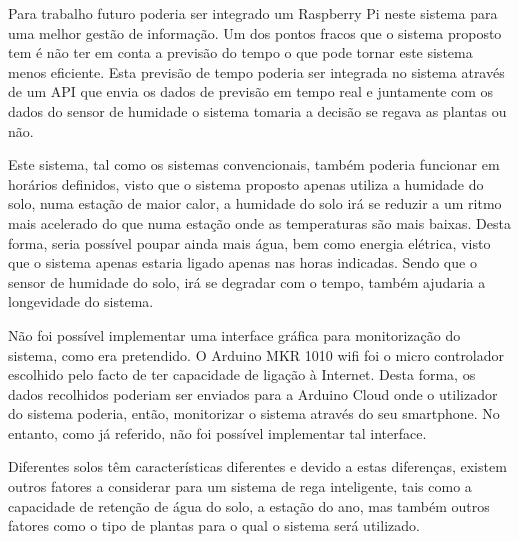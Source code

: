 \documentclass[conference]{IEEEtran}
\begin{document}
Para trabalho futuro poderia ser integrado um Raspberry Pi neste sistema para uma melhor
gestão de informação. Um dos pontos fracos que o sistema proposto tem é não
ter em conta a previsão do tempo o que pode tornar este sistema menos eficiente.
Esta previsão de tempo poderia ser integrada no sistema através de um API que
envia os dados de previsão em tempo real e juntamente com os dados do sensor de
humidade o sistema tomaria a decisão se regava as plantas ou não.

Este sistema, tal como os sistemas convencionais, também poderia funcionar em horários definidos,
visto que o sistema proposto apenas utiliza a humidade do solo, numa estação de maior calor, a humidade do solo
irá se reduzir a um ritmo mais acelerado do que numa estação onde as temperaturas são mais baixas. Desta forma,
seria possível poupar ainda mais água, bem como energia elétrica, visto que o sistema apenas estaria ligado apenas
nas horas indicadas. Sendo que o sensor de humidade do solo, irá se degradar com o tempo, também ajudaria a
longevidade do sistema.

Não foi possível implementar uma interface gráfica para monitorização do sistema, como era pretendido.
O Arduino MKR 1010 wifi foi o micro controlador escolhido pelo facto de ter capacidade de ligação à Internet.
Desta forma, os dados recolhidos poderiam ser enviados para a Arduino Cloud onde o utilizador do sistema poderia,
então, monitorizar o sistema através do seu smartphone. No entanto, como já referido, não foi possível
implementar tal interface.

Diferentes solos têm características diferentes e devido a estas diferenças, existem outros
fatores a considerar para um sistema de rega inteligente, tais como a capacidade de retenção de água do solo,
a estação do ano, mas também outros fatores como o tipo de plantas para o qual o sistema será utilizado.



\end{document}
